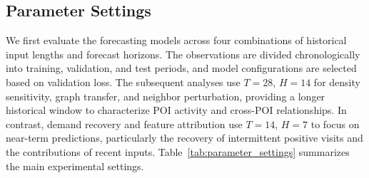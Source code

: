 \documentclass[preprint,authoryear,11pt]{elsarticle}
\theoremstyle{definition}
\begin{document}
\subsection{Parameter Settings}
\label{subsec:parameter_settings}

We first evaluate the forecasting models across four combinations of historical input lengths and forecast horizons. The observations are divided chronologically into training, validation, and test periods, and model configurations are selected based on validation loss. The subsequent analyses use \(T=28\), \(H=14\) for density sensitivity, graph transfer, and neighbor perturbation, providing a longer historical window to characterize POI activity and cross-POI relationships. In contrast, demand recovery and feature attribution use \(T=14\), \(H=7\) to focus on near-term predictions, particularly the recovery of intermittent positive visits and the contributions of recent inputs.
Table~\ref{tab:parameter_settings} summarizes the main experimental settings.
\end{document}
